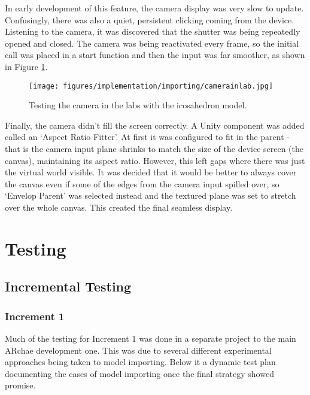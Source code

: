 \documentclass{article}
\begin{document}
In early development of this feature, the camera display was very slow to update. Confusingly, there was also a quiet, persistent clicking coming from the device. Listening to the camera, it was discovered that the shutter was being repeatedly opened and closed. The camera was being reactivated every frame, so the initial call was placed in a start function and then the input was far smoother, as shown in Figure \ref{fig:camerainlab}.

\begin{figure}[]
    \centering
    \texttt{[image: figures/implementation/importing/camerainlab.jpg]}
        \caption{Testing the camera in the labs with the icosahedron model.}
        \label{fig:camerainlab}
\end{figure}

Finally, the camera didn't fill the screen correctly. A Unity component was added called an `Aspect Ratio Fitter'. At first it was configured to fit in the parent - that is the camera input plane shrinks to match the size of the device screen (the canvas), maintaining its aspect ratio. However, this left gaps where there was just the virtual world visible. It was decided that it would be better to always cover the canvas even if some of the edges from the camera input spilled over, so `Envelop Parent' was selected instead and the textured plane was set to stretch over the whole canvas. This created the final seamless display.

\section{Testing}

\subsection{Incremental Testing}

\subsubsection{Increment 1}
Much of the testing for Increment 1 was done in a separate project to the main ARchae development one. This was due to several different experimental approaches being taken to model importing. Below it a dynamic test plan documenting the cases of model importing once the final strategy showed promise. 
\end{document}
